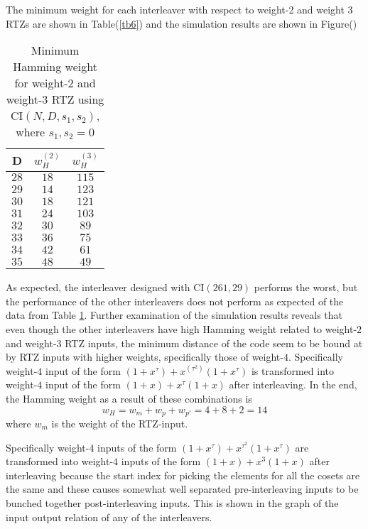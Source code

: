 \documentclass[11pt, oneside, dvipdfmx]{book}
\begin{document}
The minimum weight for each interleaver with respect to weight-2 and weight 3 RTZs are shown in Table(\ref{tb6}) and the simulation results are shown in Figure()
\begin{table}[h!]
\centering
\begin{tabular}{||c | c|c ||} 
 \hline
D &  $w_H^{(2)}$ &$w_H^{(3)}$\\
 \hline\hline
 $28$ &$18$& $115$\\
 \hline
 $29$ & $14$ & $123$\\
 \hline
 $30$ & $18$ & $121$\\
 \hline
 $31$ & $24$ & $103$\\
 \hline
$32$ & $30$ & $89$\\
 \hline
$33$ & $36$ & $75$\\
 \hline
$34$ & $42$ & $61$\\
 \hline
$35$ & $48$ & $49$\\
 \hline\hline
\end{tabular}
\caption{Minimum Hamming weight for weight-$2$ and weight-$3$ RTZ using CI$(N,D,s_1,s_2)$, where $s_1,s_2=0$}
\label{tb4}
\end{table}
As expected, the interleaver designed with CI$(261,29)$ performs the worst, but the performance of the other interleavers does not perform as expected of the data from Table \ref{tb4}. Further examination of the simulation results reveals that even though the other interleavers have high Hamming weight related to weight-$2$ and weight-$3$ RTZ inputs, the minimum distance of the code seem to be bound at by RTZ inputs with higher weights, specifically those of weight-$4$. Specifically weight-$4$ input of the form $(1+x^{\tau}) +x^{(\tau^2)}(1+x^{\tau})$ is transformed into weight-$4$ input of the form $(1+x)+x^{\tau}(1+x)$ after interleaving. In the end, the Hamming weight as a result of these combinations is $$w_H=w_m+w_p+w_{p'}=4+8+2=14$$ where $w_m$ is the weight of the RTZ-input. 

Specifically weight-$4$ inputs of the form $(1+x^{\tau}) +x^{\tau^2}(1+x^{\tau})$ are transformed into weight-$4$ inputs of the form $(1+x)+x^3(1+x)$ after interleaving because the start index for picking the elements for all the cosets are the same and these causes somewhat well separated pre-interleaving inputs to be bunched together post-interleaving inputs. This is shown in the graph of the input output relation of any of the interleavers.
\end{document}
